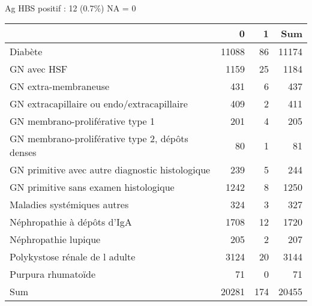 \documentclass[11pt,a4paper]{article}\usepackage[]{graphicx}\usepackage[]{color}
\begin{document}
~\\

Ag HBS positif : 12 (0.7\%) NA = 0

\begin{table}[H]
\centering
\begin{tabular}{lrrr}
  \hline
 & 0 & 1 & Sum \\ 
  \hline
Diabète & 11088 & 86 & 11174 \\ 
  GN avec HSF & 1159 & 25 & 1184 \\ 
  GN extra-membraneuse & 431 & 6 & 437 \\ 
  GN extracapillaire ou endo/extracapillaire & 409 & 2 & 411 \\ 
  GN membrano-proliférative type 1 & 201 & 4 & 205 \\ 
  GN membrano-proliférative type 2, dépôts denses & 80 & 1 & 81 \\ 
  GN primitive avec autre diagnostic histologique & 239 & 5 & 244 \\ 
  GN primitive sans examen histologique & 1242 & 8 & 1250 \\ 
  Maladies systémiques autres & 324 & 3 & 327 \\ 
  Néphropathie à dépôts d'IgA & 1708 & 12 & 1720 \\ 
  Néphropathie lupique & 205 & 2 & 207 \\ 
  Polykystose rénale de l adulte & 3124 & 20 & 3144 \\ 
  Purpura rhumatoïde & 71 & 0 & 71 \\ 
  Sum & 20281 & 174 & 20455 \\ 
   \hline
\end{tabular}
\end{table}
\end{document}
